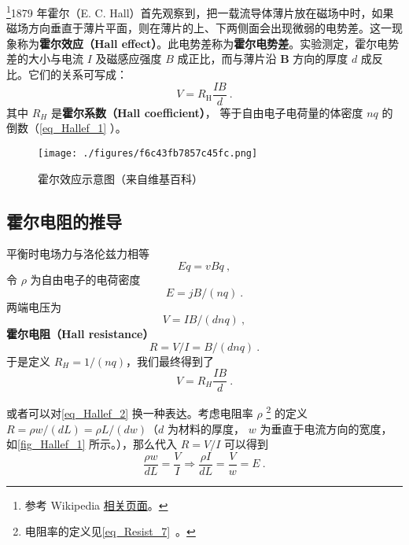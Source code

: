 
\begin{issues}
\issueDraft
\end{issues}

\footnote{参考 Wikipedia \href{https://en.wikipedia.org/wiki/Hall_effect}{相关页面}。}1879 年霍尔（E. C. Hall）首先观察到，把一载流导体薄片放在磁场中时，如果磁场方向垂直于薄片平面，则在薄片的上、下两侧面会出现微弱的电势差。这一现象称为\textbf{霍尔效应（Hall effect）}。此电势差称为\textbf{霍尔电势差}。实验测定，霍尔电势差的大小与电流 $I$ 及磁感应强度 $B$ 成正比，而与薄片沿 $\mathbf B$ 方向的厚度 $d$ 成反比。它们的关系可写成：
\begin{equation}
V = R_{\mathrm{H}} \frac{I B}{d}~.
\end{equation}
其中 $R_H$ 是\textbf{霍尔系数（Hall coefficient）}， 等于自由电子电荷量的体密度 $nq$ 的倒数（\autoref{eq_Hallef_1} ）。

\begin{figure}[ht]
\centering
\texttt{[image: ./figures/f6c43fb7857c45fc.png]}
\caption{霍尔效应示意图（来自维基百科）} \label{fig_Hallef_1}
\end{figure}

\subsection{霍尔电阻的推导}
平衡时电场力与洛伦兹力相等
\begin{equation}
Eq = vBq~,
\end{equation}
令 $\rho$ 为自由电子的电荷密度
\begin{equation}
E = jB/(nq)~.
\end{equation}
两端电压为
\begin{equation}\label{eq_Hallef_1}
V = IB/(d n q)~,
\end{equation}
\textbf{霍尔电阻（Hall resistance）}
\begin{equation}\label{eq_Hallef_2}
R = V/I = B/(d n q)~.
\end{equation}
于是定义 $R_H=1/(nq)$，我们最终得到了
\begin{equation}
V=R_H\frac{IB}{d}~.
\end{equation}

或者可以对\autoref{eq_Hallef_2} 换一种表达。考虑电阻率 $\rho$
\footnote{电阻率的定义见\autoref{eq_Resist_7}~。} 的定义 $R=\rho w / (dL)=\rho L /(dw)$（$d$ 为材料的厚度， $w$ 为垂直于电流方向的宽度，如\autoref{fig_Hallef_1} 所示。），那么代入 $R=V/I$ 可以得到
\begin{equation}
\frac{\rho w}{dL} = \frac{V}{I}\Rightarrow \frac{\rho I}{dL}=\frac{V}{w}=E~.
\end{equation}

